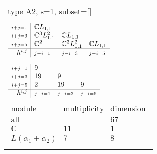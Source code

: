 \documentclass[crop,border=2mm]{standalone}
\begin{document}
\begin{tabular}{l}
{\huge type A2, s=1, subset=[]}\\ \\


$\displaystyle
\begin{array}{r|l l l}
	{\scriptstyle i+j=1}&\mathbb{C}L_{1,1}&&\\
	{\scriptstyle i+j=3}&\mathbb{C}^{3}L_{1,1}^{2}&\mathbb{C}L_{1,1}&\\
	{\scriptstyle i+j=5}&\mathbb{C}^{2}&\mathbb{C}^{3}L_{1,1}^{2}&\mathbb{C}L_{1,1}\\
	\hline h^{i,j}&{\scriptstyle j-i=1}&{\scriptstyle j-i=3}&{\scriptstyle j-i=5}
\end{array}
$ \\ \\


$\displaystyle
\begin{array}{r|l l l}
	{\scriptstyle i+j=1}&9&&\\
	{\scriptstyle i+j=3}&19&9&\\
	{\scriptstyle i+j=5}&2&19&9\\
	\hline h^{i,j}&{\scriptstyle j-i=1}&{\scriptstyle j-i=3}&{\scriptstyle j-i=5}
\end{array}
$ \\ \\


$\displaystyle
\begin{array}{rll}
	\text{module}&\text{multiplicity}&\text{dimension} \\ \hline \text{all}&&67 \\
	\mathbb{C}&11&1\\
	L\left(\alpha_{1}+\alpha_{2}\right)&7&8
\end{array}
$ \\ \\

\end{tabular}
\end{document}
